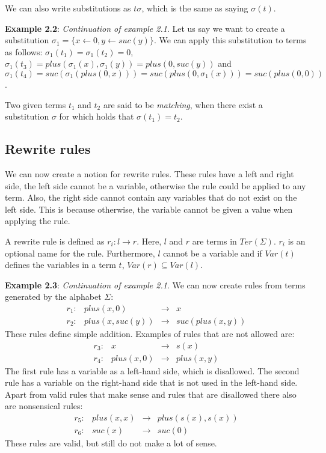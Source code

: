 We can also write substitutions as $t \sigma$, which is the same as saying $\sigma(t)$.

\textbf{Example 2.2}: \textit{Continuation of example 2.1}. Let us say we want to create a substitution $\sigma_1 = \{ x \leftarrow 0, y \leftarrow suc(y) \}$. We can apply this substitution to terms as follows: $\sigma_1(t_1) = \sigma_1(t_2) = 0$, $\sigma_1(t_3) = plus(\sigma_1(x), \sigma_1(y)) = plus(0, suc(y))$ and $\sigma_1(t_4) = suc(\sigma_1(plus(0, x))) = suc(plus(0, \sigma_1(x))) = suc(plus(0, 0))$.

\begin{definition}
Two given terms $t_1$ and $t_2$ are said to be \textit{matching}, when there exist a substitution $\sigma$ for which holds that $\sigma(t_1) = t_2$.
\end{definition}

\subsection{Rewrite rules}
We can now create a notion for rewrite rules. These rules have a left and right side, the left side cannot be a variable, otherwise the rule could be applied to any term. Also, the right side cannot contain any variables that do not exist on the left side. This is because otherwise, the variable cannot be given a value when applying the rule.
\begin{definition}
A rewrite rule is defined as $r_i : l \rightarrow r$. Here, $l$ and $r$ are terms in $\textit{Ter}(\Sigma)$. $r_i$ is an optional name for the rule. Furthermore, $l$ cannot be a variable and if $\textit{Var}(t)$ defines the variables in a term $t$, $\textit{Var}(r) \subseteq \textit{Var}(l)$. 
\end{definition}

\textbf{Example 2.3}: \textit{Continuation of example 2.1}. We can now create rules from terms generated by the alphabet $\Sigma$:\newline
$$
\begin{array}{lrcl}
    r_1: & plus(x, 0) & \rightarrow & x \\
    r_2: & plus(x, suc(y)) & \rightarrow & suc(plus(x, y))
\end{array}
$$
These rules define simple addition. Examples of rules that are not allowed are: 
$$
\begin{array}{lrcl}
    r_3: & x & \rightarrow & s(x) \\
    r_4: & plus(x, 0) & \rightarrow & plus(x, y)
\end{array}
$$
The first rule has a variable as a left-hand side, which is disallowed. The second rule has a variable on the right-hand side that is not used in the left-hand side. Apart from valid rules that make sense and rules that are disallowed there also are nonsensical rules:
$$
\begin{array}{lrcl}
    r_5: & plus(x, x) & \rightarrow & plus(s(x), s(x)) \\
    r_6: & suc(x) & \rightarrow & suc(0)
\end{array}
$$
These rules are valid, but still do not make a lot of sense.


